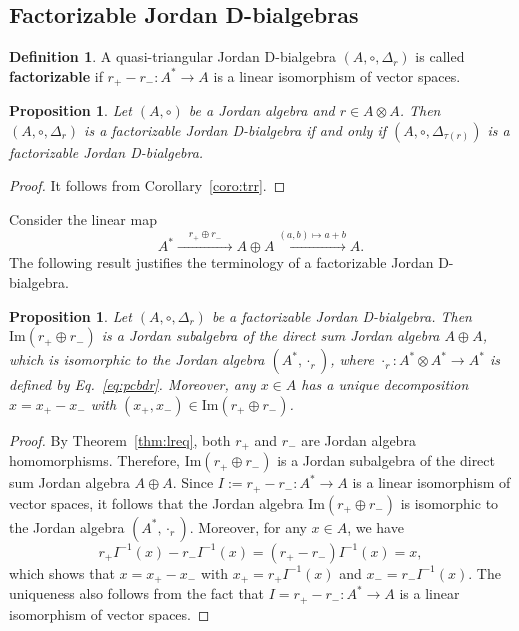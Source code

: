 \documentclass[12pt, reqno, a4paper]{amsart}
\newtheorem{proposition}[theorem]{Proposition}
\theoremstyle{definition}
\newtheorem{definition}[theorem]{Definition}
\begin{document}
\subsection{Factorizable Jordan D-bialgebras}


\begin{definition}
	A quasi-triangular Jordan D-bialgebra $(A,\circ, \Delta_{r})$ is called \textbf{factorizable} if $r_{+} - r_{-}: A^* \to A$ is a linear isomorphism of vector spaces.
\end{definition}

\begin{proposition}\label{prop:factorJba}
	Let $(A, \circ)$ be a Jordan algebra and $r \in A \otimes A$.
	Then $(A, \circ, \Delta_r)$ is a factorizable Jordan D-bialgebra if and only if $(A, \circ, \Delta_{\tau(r)})$ is a factorizable Jordan D-bialgebra.
\end{proposition}
\begin{proof}
	It follows from Corollary~\ref{coro:trr}.
\end{proof}


Consider the linear map
\begin{equation*}
	A^* \xrightarrow{\;\;\;\; r_{+} \oplus r_{-}\;\;\;\;} A \oplus A \xrightarrow{(a, b) \mapsto a + b} A.
\end{equation*}
The following result justifies the terminology of a factorizable Jordan D-bialgebra.
\begin{proposition}\label{prop:fpt}
	Let $(A, \circ, \Delta_{r})$ be a factorizable Jordan D-bialgebra.
	Then $\mathrm{Im}(r_{+} \oplus r_{-})$ is a Jordan subalgebra of the direct sum Jordan algebra $A \oplus A$,
	which is isomorphic to the Jordan algebra $(A^*, \cdot_{r})$, where $\cdot_{r}: A^* \otimes A^* \to A^*$ is defined by Eq.~\eqref{eq:pcbdr}.
	Moreover, any $x \in A$ has a unique decomposition
	$x = x_{+} - x_{-}$ with $(x_{+}, x_{-}) \in \mathrm{Im}(r_{+} \oplus r_{-})$.
\end{proposition}
\begin{proof}
	By Theorem~\ref{thm:lreq}, both $r_{+}$ and $r_{-}$ are Jordan algebra homomorphisms.
	Therefore, $\mathrm{Im}(r_{+} \oplus r_{-})$ is a Jordan subalgebra of the direct sum Jordan algebra $A \oplus A$.
	Since $I := r_{+} - r_{-}: A^* \to A$ is a linear isomorphism of vector spaces, it follows that the Jordan algebra $\mathrm{Im}(r_{+} \oplus r_{-})$ is isomorphic to the Jordan algebra $(A^*, \cdot_r)$.
	Moreover, for any $x \in A$, we have
	\begin{equation*}
		r_{+}I^{-1}(x) - r_{-}I^{-1}(x) = (r_{+} - r_{-}) I^{-1}(x)= x,
	\end{equation*}
	which shows that $x = x_{+} - x_{-}$ with $x_{+} = r_{+}I^{-1}(x)$ and $x_{-} = r_{-}I^{-1}(x)$.
	The uniqueness also follows from the fact that $I= r_{+} - r_{-}: A^* \to A$ is a linear isomorphism of vector spaces.
\end{proof}
\end{document}
